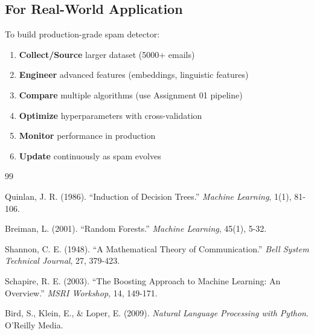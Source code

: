 \documentclass[14pt,a4paper]{report}
\begin{document}
\subsection{For Real-World Application}

To build production-grade spam detector:

\begin{enumerate}
    \item \textbf{Collect/Source} larger dataset (5000+ emails)
    \item \textbf{Engineer} advanced features (embeddings, linguistic features)
    \item \textbf{Compare} multiple algorithms (use Assignment 01 pipeline)
    \item \textbf{Optimize} hyperparameters with cross-validation
    \item \textbf{Monitor} performance in production
    \item \textbf{Update} continuously as spam evolves
\end{enumerate}

\begin{thebibliography}{99}

 Quinlan, J. R. (1986). ``Induction of Decision Trees.'' \textit{Machine Learning}, 1(1), 81-106.

 Breiman, L. (2001). ``Random Forests.'' \textit{Machine Learning}, 45(1), 5-32.

 Shannon, C. E. (1948). ``A Mathematical Theory of Communication.'' \textit{Bell System Technical Journal}, 27, 379-423.

 Schapire, R. E. (2003). ``The Boosting Approach to Machine Learning: An Overview.'' \textit{MSRI Workshop}, 14, 149-171.

 Bird, S., Klein, E., \& Loper, E. (2009). \textit{Natural Language Processing with Python}. O'Reilly Media.

\end{thebibliography}
\end{document}
